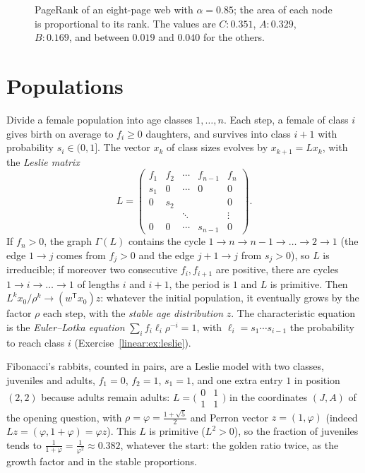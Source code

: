 \begin{figure}[ht]
\centering
{}
\caption{PageRank of an eight-page web with $\alpha=0.85$; the area of each node is proportional to its rank. The values
are $C:0.351$, $A:0.329$, $B:0.169$, and between $0.019$ and $0.040$ for the others.}
\label{linear:fig:pagerank}
\end{figure}

\section{Populations}

\begin{example}\label{linear:exa:leslie}
Divide a female population into age classes $1,\dots,n$. Each step, a female of class $i$ gives birth on average to $f_i\ge0$
daughters, and survives into class $i+1$ with probability $s_i\in(0,1]$. The vector $x_k$ of class sizes evolves by
$x_{k+1}=Lx_k$, with the \emph{Leslie matrix}
\[
L=\begin{pmatrix}f_1&f_2&\cdots&f_{n-1}&f_n\\s_1&0&\cdots&0&0\\0&s_2&&&0\\&&\ddots&&\vdots\\0&0&\cdots&s_{n-1}&0\end{pmatrix}.
\]
If $f_n>0$, the graph $\Gamma(L)$ contains the cycle $1\to n\to n-1\to\dots\to2\to1$ (the edge $1\to j$ comes from
$f_j>0$ and the edge $j+1\to j$ from $s_j>0$), so $L$ is irreducible; if moreover two consecutive $f_i,f_{i+1}$ are positive,
there are cycles $1\to i\to\dots\to1$ of lengths $i$ and $i+1$, the period is $1$ and $L$ is primitive. Then $L^kx_0/\rho^k\to(w^{\mathsf T}x_0)z$: whatever the initial population,
it eventually grows by the factor $\rho$ each step, with the \emph{stable age distribution} $z$. The characteristic equation
is the \emph{Euler--Lotka equation} $\sum_if_i\ell_i\rho^{-i}=1$, with $\ell_i=s_1\cdots s_{i-1}$ the probability to reach class
$i$ (Exercise~\ref{linear:ex:leslie}).

Fibonacci's rabbits, counted in pairs, are a Leslie model with two classes, juveniles and adults, $f_1=0$,
$f_2=1$, $s_1=1$, and one extra entry $1$ in position $(2,2)$ because adults remain adults:
$L=\bigl(\begin{smallmatrix}0&1\\1&1\end{smallmatrix}\bigr)$ in the coordinates $(J,A)$ of the opening question, with
$\rho=\varphi=\frac{1+\sqrt5}2$ and Perron vector $z=(1,\varphi)$ (indeed $Lz=(\varphi,1+\varphi)=\varphi z$). This $L$ is
primitive ($L^2>0$), so the fraction of juveniles tends to $\frac1{1+\varphi}=\frac1{\varphi^2}\approx0.382$, whatever the
start: the golden ratio twice, as the growth factor and in the stable proportions.
\end{example}

